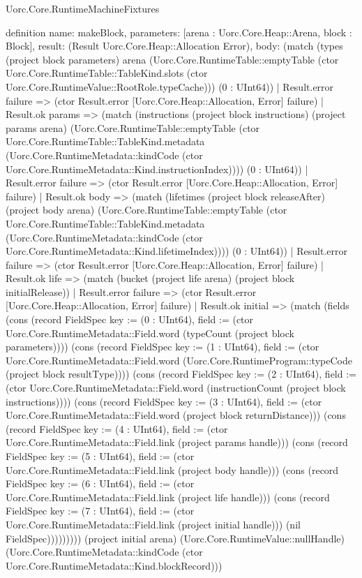 \begin{lexlean}{Uorc.Core.RuntimeMachineFixtures}
\begin{semanticmodule}
definition{
  name: makeBlock,
  parameters: [arena : Uorc.Core.Heap::Arena, block : Block],
  result: (Result Uorc.Core.Heap::Allocation Error),
  body: (match (types (project block parameters) arena (Uorc.Core.RuntimeTable::emptyTable (ctor Uorc.Core.RuntimeTable::TableKind.slots (ctor Uorc.Core.RuntimeValue::RootRole.typeCache))) (0 : UInt64))
    | Result.error failure => (ctor Result.error [Uorc.Core.Heap::Allocation, Error] failure)
    | Result.ok params => (match (instructions (project block instructions) (project params arena) (Uorc.Core.RuntimeTable::emptyTable (ctor Uorc.Core.RuntimeTable::TableKind.metadata (Uorc.Core.RuntimeMetadata::kindCode (ctor Uorc.Core.RuntimeMetadata::Kind.instructionIndex)))) (0 : UInt64))
      | Result.error failure => (ctor Result.error [Uorc.Core.Heap::Allocation, Error] failure)
      | Result.ok body => (match (lifetimes (project block releaseAfter) (project body arena) (Uorc.Core.RuntimeTable::emptyTable (ctor Uorc.Core.RuntimeTable::TableKind.metadata (Uorc.Core.RuntimeMetadata::kindCode (ctor Uorc.Core.RuntimeMetadata::Kind.lifetimeIndex)))) (0 : UInt64))
        | Result.error failure => (ctor Result.error [Uorc.Core.Heap::Allocation, Error] failure)
        | Result.ok life => (match (bucket (project life arena) (project block initialRelease))
          | Result.error failure => (ctor Result.error [Uorc.Core.Heap::Allocation, Error] failure)
          | Result.ok initial => (match (fields (cons (record FieldSpec {key := (0 : UInt64), field := (ctor Uorc.Core.RuntimeMetadata::Field.word (typeCount (project block parameters)))}) (cons (record FieldSpec {key := (1 : UInt64), field := (ctor Uorc.Core.RuntimeMetadata::Field.word (Uorc.Core.RuntimeProgram::typeCode (project block resultType)))}) (cons (record FieldSpec {key := (2 : UInt64), field := (ctor Uorc.Core.RuntimeMetadata::Field.word (instructionCount (project block instructions)))}) (cons (record FieldSpec {key := (3 : UInt64), field := (ctor Uorc.Core.RuntimeMetadata::Field.word (project block returnDistance))}) (cons (record FieldSpec {key := (4 : UInt64), field := (ctor Uorc.Core.RuntimeMetadata::Field.link (project params handle))}) (cons (record FieldSpec {key := (5 : UInt64), field := (ctor Uorc.Core.RuntimeMetadata::Field.link (project body handle))}) (cons (record FieldSpec {key := (6 : UInt64), field := (ctor Uorc.Core.RuntimeMetadata::Field.link (project life handle))}) (cons (record FieldSpec {key := (7 : UInt64), field := (ctor Uorc.Core.RuntimeMetadata::Field.link (project initial handle))}) (nil FieldSpec))))))))) (project initial arena) (Uorc.Core.RuntimeValue::nullHandle) (Uorc.Core.RuntimeMetadata::kindCode (ctor Uorc.Core.RuntimeMetadata::Kind.blockRecord)))
}
\end{semanticmodule}
\end{lexlean}
